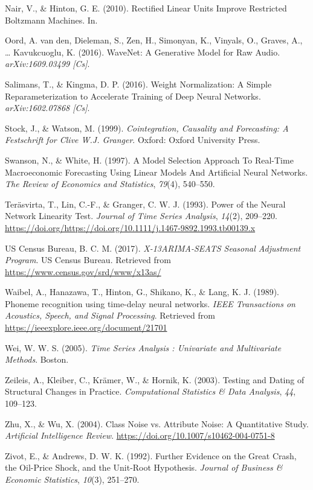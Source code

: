 \documentclass[oneside]{book}
\begin{document}
\leavevmode\hypertarget{ref-nairRectifiedLinearUnits2010}{}%
Nair, V., \& Hinton, G. E. (2010). Rectified Linear Units Improve Restricted Boltzmann Machines. In.

\leavevmode\hypertarget{ref-oordWaveNetGenerativeModel2016}{}%
Oord, A. van den, Dieleman, S., Zen, H., Simonyan, K., Vinyals, O., Graves, A., \ldots{} Kavukcuoglu, K. (2016). WaveNet: A Generative Model for Raw Audio. \emph{arXiv:1609.03499 {[}Cs{]}}.

\leavevmode\hypertarget{ref-salimansWeightNormalizationSimple2016}{}%
Salimans, T., \& Kingma, D. P. (2016). Weight Normalization: A Simple Reparameterization to Accelerate Training of Deep Neural Networks. \emph{arXiv:1602.07868 {[}Cs{]}}.

\leavevmode\hypertarget{ref-stockCointegrationCausalityForecasting1999}{}%
Stock, J., \& Watson, M. (1999). \emph{Cointegration, Causality and Forecasting: A Festschrift for Clive W.J. Granger}. Oxford: Oxford University Press.

\leavevmode\hypertarget{ref-swansonModelSelectionApproach1997}{}%
Swanson, N., \& White, H. (1997). A Model Selection Approach To Real-Time Macroeconomic Forecasting Using Linear Models And Artificial Neural Networks. \emph{The Review of Economics and Statistics}, \emph{79}(4), 540--550.

\leavevmode\hypertarget{ref-terasvirtaPowerNeuralNetwork1993}{}%
Teräsvirta, T., Lin, C.-F., \& Granger, C. W. J. (1993). Power of the Neural Network Linearity Test. \emph{Journal of Time Series Analysis}, \emph{14}(2), 209--220. \url{https://doi.org/https://doi.org/10.1111/j.1467-9892.1993.tb00139.x}

\leavevmode\hypertarget{ref-uscensusbureauX13ARIMASEATSSeasonalAdjustment2017}{}%
US Census Bureau, B. C. M. (2017). \emph{X-13ARIMA-SEATS Seasonal Adjustment Program}. US Census Bureau. Retrieved from \url{https://www.census.gov/srd/www/x13as/}

\leavevmode\hypertarget{ref-waibelPhonemeRecognitionUsing1989}{}%
Waibel, A., Hanazawa, T., Hinton, G., Shikano, K., \& Lang, K. J. (1989). Phoneme recognition using time-delay neural networks. \emph{IEEE Transactions on Acoustics, Speech, and Signal Processing}. Retrieved from \url{https://ieeexplore.ieee.org/document/21701}

\leavevmode\hypertarget{ref-weiTimeSeriesAnalysis2005}{}%
Wei, W. W. S. (2005). \emph{Time Series Analysis : Univariate and Multivariate Methods}. Boston.

\leavevmode\hypertarget{ref-zeileisTestingDatingStructural2003}{}%
Zeileis, A., Kleiber, C., Krämer, W., \& Hornik, K. (2003). Testing and Dating of Structural Changes in Practice. \emph{Computational Statistics \& Data Analysis}, \emph{44}, 109--123.

\leavevmode\hypertarget{ref-zhuClassNoiseVs2004}{}%
Zhu, X., \& Wu, X. (2004). Class Noise vs. Attribute Noise: A Quantitative Study. \emph{Artificial Intelligence Review}. \url{https://doi.org/10.1007/s10462-004-0751-8}

\leavevmode\hypertarget{ref-zivotFurtherEvidenceGreat1992}{}%
Zivot, E., \& Andrews, D. W. K. (1992). Further Evidence on the Great Crash, the Oil-Price Shock, and the Unit-Root Hypothesis. \emph{Journal of Business \& Economic Statistics}, \emph{10}(3), 251--270.
\end{document}
